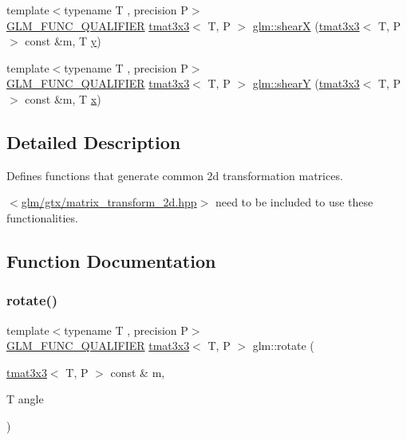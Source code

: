 \begin{DoxyCompactItemize}
\item 
{\footnotesize template$<$typename T , precision P$>$ }\\\mbox{\hyperlink{setup_8hpp_a33fdea6f91c5f834105f7415e2a64407}{G\+L\+M\+\_\+\+F\+U\+N\+C\+\_\+\+Q\+U\+A\+L\+I\+F\+I\+ER}} \mbox{\hyperlink{structglm_1_1tmat3x3}{tmat3x3}}$<$ T, P $>$ \mbox{\hyperlink{group__gtx__matrix__transform__2d_gab3363478cb625e40c5bd924fd838cf54}{glm\+::shearX}} (\mbox{\hyperlink{structglm_1_1tmat3x3}{tmat3x3}}$<$ T, P $>$ const \&m, T \mbox{\hyperlink{glad_8h_a66ddd433d2cacfe27f5906b7e86faeed}{y}})
\item 
{\footnotesize template$<$typename T , precision P$>$ }\\\mbox{\hyperlink{setup_8hpp_a33fdea6f91c5f834105f7415e2a64407}{G\+L\+M\+\_\+\+F\+U\+N\+C\+\_\+\+Q\+U\+A\+L\+I\+F\+I\+ER}} \mbox{\hyperlink{structglm_1_1tmat3x3}{tmat3x3}}$<$ T, P $>$ \mbox{\hyperlink{group__gtx__matrix__transform__2d_ga69bfb47d250df7464a5b14f2b95a9b4a}{glm\+::shearY}} (\mbox{\hyperlink{structglm_1_1tmat3x3}{tmat3x3}}$<$ T, P $>$ const \&m, T \mbox{\hyperlink{glad_8h_a92d0386e5c19fb81ea88c9f99644ab1d}{x}})
\end{DoxyCompactItemize}


\subsection{Detailed Description}
Defines functions that generate common 2d transformation matrices. 

$<$\mbox{\hyperlink{matrix__transform__2d_8hpp}{glm/gtx/matrix\+\_\+transform\+\_\+2d.\+hpp}}$>$ need to be included to use these functionalities. 

\subsection{Function Documentation}
\mbox{\label{group__gtx__matrix__transform__2d_ga23ec870ee4b75d85cc021e0fd1532b48}} 
\subsubsection{\texorpdfstring{rotate()}{rotate()}}
{\footnotesize\ttfamily template$<$typename T , precision P$>$ \\
\mbox{\hyperlink{setup_8hpp_a33fdea6f91c5f834105f7415e2a64407}{G\+L\+M\+\_\+\+F\+U\+N\+C\+\_\+\+Q\+U\+A\+L\+I\+F\+I\+ER}} \mbox{\hyperlink{structglm_1_1tmat3x3}{tmat3x3}}$<$ T, P $>$ glm\+::rotate (\begin{DoxyParamCaption}\item[{\mbox{\hyperlink{structglm_1_1tmat3x3}{tmat3x3}}$<$ T, P $>$ const \&}]{m,  }\item[{T}]{angle }\end{DoxyParamCaption})}

